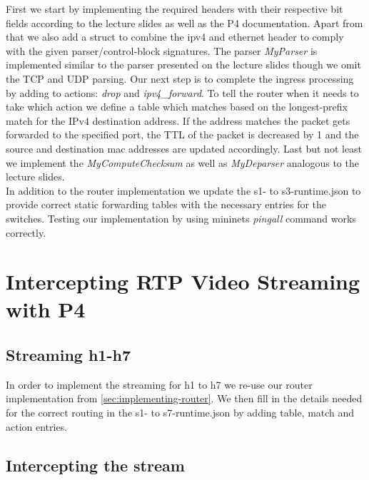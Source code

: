 \documentclass[a4paper,11pt]{article}
\newcommand{\note}[1]{\textit{\textcolor{gray}{#1}}}
\begin{document}
First we start by implementing the required headers with their respective bit fields according to the lecture slides as well as the P4 documentation.
Apart from that we also add a struct to combine the ipv4 and ethernet header to comply with the given parser/control-block signatures.
The parser \textit{MyParser} is implemented similar to the parser presented on the lecture slides though we omit the TCP and UDP parsing.
Our next step is to complete the ingress processing by adding to actions: \textit{drop} and \textit{ipv4\_forward}.
To tell the router when it needs to take which action we define a table which matches based on the longest-prefix match for the IPv4 destination address.
If the address matches the packet gets forwarded to the specified port, the TTL of the packet is decreased by 1 and the source and destination mac addresses are updated accordingly.
Last but not least we implement the \textit{MyComputeChecksum} as well as \textit{MyDeparser} analogous to the lecture slides.\\
In addition to the router implementation we update the s1- to s3-runtime.json to provide correct static forwarding tables with the necessary entries for the switches.
Testing our implementation by using mininets \textit{pingall} command works correctly.


\section{Intercepting RTP Video Streaming with P4}


\subsection{Streaming h1-h7}

In order to implement the streaming for h1 to h7 we re-use our router implementation from \autoref{sec:implementing-router}.
We then fill in the details needed for the correct routing in the s1- to s7-runtime.json by adding table, match and action entries.

\subsection{Intercepting the stream}
\end{document}
